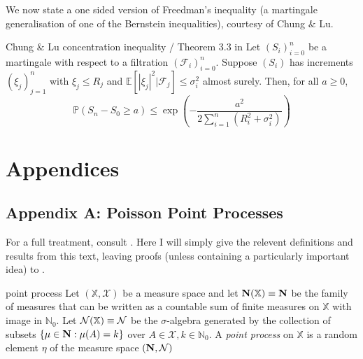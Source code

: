 \documentclass{article}
\newcounter{definitioncount} %
\newcounter{lemmacount}
\newcounter{examplecount}
\newcounter{theoremcount}
\newcounter{propositioncount}
\newcounter{corollarycount}
\newcounter{remarkcount}
\begin{document}
We now state a one sided version of Freedman's inequality (a martingale generalisation of one of the Bernstein 
inequalities), courtesy of Chung $\&$ Lu. 

\begin{proposition}[]{Chung $\&$ Lu concentration inequality / Theorem 3.3 in \cite{campos2023}}
    Let $(S_i)_{i=0}^n$ be a martingale with respect to a filtration $(\mathcal{F}_i)_{i=0}^n$. Suppose $(S_i)$ 
    has increments $(\xi_j)_{j=1}^n$ with $\xi_j \leq R_j$ and $\mathbb{E}[|\xi_j|^2 | \mathcal{F}_j] \leq \sigma_i^2$ 
    almost surely. Then, for all $a \geq 0$, \[\mathbb{P}(S_n - S_0 \geq a) 
    \leq \exp\left(-\frac{a^2}{2\sum_{i=1}^n(R_i^2 + \sigma_i^2)}\right)\]
\end{proposition}

\newpage

\section{Appendices}

\setcounter{lemmacount}{1}
\setcounter{examplecount}{1}
\setcounter{theoremcount}{1}
\setcounter{propositioncount}{1}
\setcounter{corollarycount}{1}
\setcounter{remarkcount}{1}
\setcounter{definitioncount}{1}

\subsection{Appendix A: Poisson Point Processes}

For a full treatment, consult \cite{Last_Penrose_2017}. Here I will simply give the relevent definitions and 
results from this text, leaving proofs (unless containing a particularly important idea) to \cite{Last_Penrose_2017}.

\begin{definition}[]{point process}
    Let $(\mathbb{X}, \mathcal{X})$ be a measure space and let ${\bf N}(\mathbb{X}) \equiv {\bf N}$ be the family 
    of measures that can be written as a countable sum of finite measures on $\mathbb{X}$ with image in $\mathbb{N}_0$. 
    Let ${\bf \mathcal{N}}(\mathbb{X}) \equiv {\bf \mathcal{N}}$ be the $\sigma$-algebra generated by the collection 
    of subsets $\{\mu \in {\bf N} : \mu(A) = k\}$ over $A \in \mathcal{X}, k \in \mathbb{N}_0$. A {\it point process}
    on $\mathbb{X}$ is a random element $\eta$ of the measure space $({\bf N}, {\bf \mathcal{N}})$
\end{definition}
\end{document}
